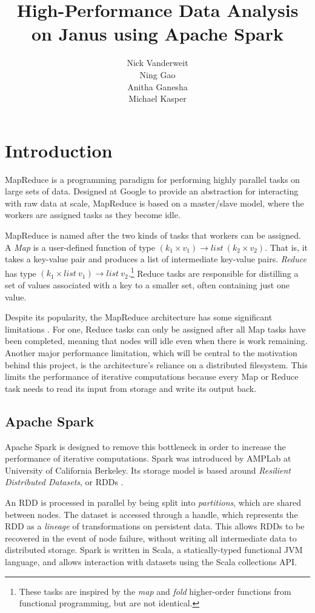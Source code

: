 \documentclass{article}
\title{High-Performance Data Analysis on Janus using Apache Spark}
\author{Nick Vanderweit \\
        Ning Gao \\
        Anitha Ganesha \\
        Michael Kasper}
\begin{document}
\maketitle

\section*{Introduction}
MapReduce \citep{dean-mapreduce} is a programming paradigm for performing highly
parallel tasks on large sets of data. Designed at Google to provide an
abstraction for interacting with raw data at scale, MapReduce is based on
a master/slave model, where the workers are assigned tasks as they become idle.

MapReduce is named after the two kinds of tasks that workers can be assigned.
A \emph{Map} is a user-defined function of type
$(k_1 \times v_1) \rightarrow list \: (k_2 \times v_2)$.
That is, it takes a key-value pair and produces a list of
intermediate key-value pairs. \emph{Reduce} has type
$(k_1 \times list \: v_1) \rightarrow list \: v_2$.\footnote{
These tasks are inspired by the \emph{map} and \emph{fold}
higher-order functions from functional programming, but are not identical.}
Reduce tasks are responsible for distilling a set of values associated with
a key to a smaller set, often containing just one value.

Despite its popularity, the MapReduce architecture has some significant
limitations \citep{lee-survey}. For one, Reduce tasks can only be assigned after
all Map tasks have been completed, meaning that nodes will idle even when there
is work remaining. Another major performance limitation, which will be central
to the motivation behind this project, is the architecture's reliance on a
distributed filesystem. This limits the performance of iterative computations
because every Map or Reduce task needs to read its input from storage and write
its output back.

\subsection*{Apache Spark}
Apache Spark \citep{zaharia} is designed to remove this bottleneck in order to
increase the performance of iterative computations. Spark was introduced by
AMPLab at University of California Berkeley. Its storage model is
based around \emph{Resilient Distributed Datasets}, or
RDDs \citep{zaharia_rdd}.

An RDD is processed in parallel by being split into \emph{partitions}, which
are shared between nodes. The dataset is accessed through a handle, which
represents the RDD as a \emph{lineage} of transformations on persistent data.
This allows RDDs to be recovered in the event of node failure, without writing
all intermediate data to distributed storage. Spark is written in Scala,
a statically-typed functional JVM language, and allows interaction with datasets
using the Scala collections API.
\end{document}
